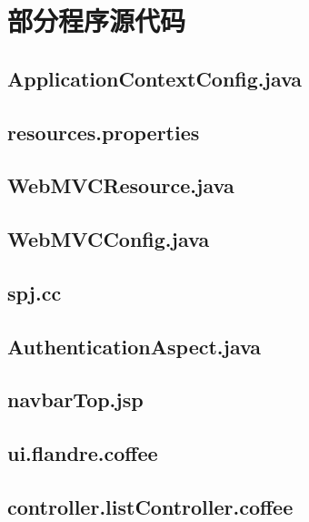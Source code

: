
\chapter{部分程序源代码}
\section{ApplicationContextConfig.java}\label{sec:ApplicationContextConfig}


\section{resources.properties}\label{sec:resources}


\section{WebMVCResource.java}\label{sec:WebMVCResource}


\section{WebMVCConfig.java}\label{sec:WebMVCConfig}


\section{spj.cc}\label{sec:spj}


\section{AuthenticationAspect.java}\label{sec:AuthenticationAspect}


\section{navbarTop.jsp}\label{sec:navbarTop}


\section{ui.flandre.coffee}\label{sec:flandre}


\section{controller.listController.coffee}\label{sec:listController}

